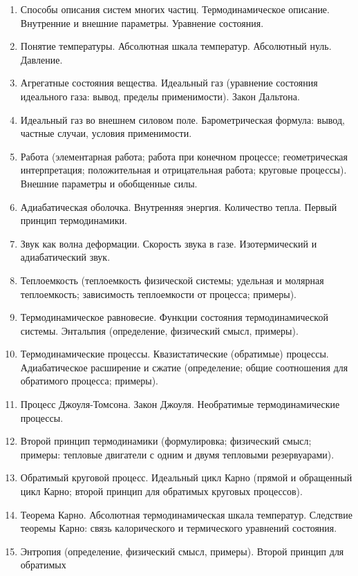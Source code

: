 \documentclass{article}
\begin{document}
\begin{enumerate}
	\item Способы описания систем многих частиц. Термодинамическое описание. Внутренние и
	      внешние параметры. Уравнение состояния.
	\item Понятие температуры. Абсолютная шкала температур. Абсолютный нуль. Давление.
	\item Агрегатные состояния вещества. Идеальный газ (уравнение состояния идеального газа:
	      вывод, пределы применимости). Закон Дальтона.
	\item Идеальный газ во внешнем силовом поле. Барометрическая формула: вывод, частные
	      случаи, условия применимости.
	\item Работа (элементарная работа; работа при конечном процессе; геометрическая
	      интерпретация; положительная и отрицательная работа; круговые процессы). Внешние
	      параметры и обобщенные силы.
	\item Адиабатическая оболочка. Внутренняя энергия. Количество тепла. Первый принцип
	      термодинамики.
	\item Звук как волна деформации. Скорость звука в газе. Изотермический и адиабатический
	      звук.
	\item Теплоемкость (теплоемкость физической системы; удельная и молярная теплоемкость;
	      зависимость теплоемкости от процесса; примеры).
	\item Термодинамическое равновесие. Функции состояния термодинамической системы.
	      Энтальпия (определение, физический смысл, примеры).
	\item Термодинамические процессы. Квазистатические (обратимые) процессы. Адиабатическое
	      расширение и сжатие (определение; общие соотношения для обратимого процесса;
	      примеры).
	\item Процесс Джоуля-Томсона. Закон Джоуля. Необратимые термодинамические процессы.
	\item Второй принцип термодинамики (формулировка; физический смысл; примеры: тепловые
	      двигатели с одним и двумя тепловыми резервуарами).
	\item Обратимый круговой процесс. Идеальный цикл Карно (прямой и обращенный цикл
	      Карно; второй принцип для обратимых круговых процессов).
	\item Теорема Карно. Абсолютная термодинамическая шкала температур. Следствие теоремы
	      Карно: связь калорического и термического уравнений состояния.
	\item Энтропия (определение, физический смысл, примеры). Второй принцип для обратимых

\end{enumerate}
\end{document}
